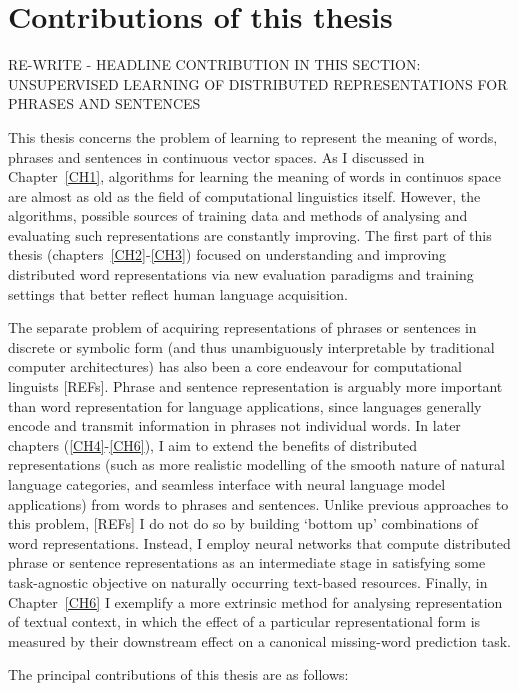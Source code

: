 
\section{Contributions of this thesis}


RE-WRITE - HEADLINE CONTRIBUTION IN THIS SECTION: UNSUPERVISED LEARNING OF DISTRIBUTED REPRESENTATIONS FOR PHRASES AND SENTENCES

This thesis concerns the problem of learning to represent the meaning of words, phrases and sentences in continuous vector spaces. As I discussed in Chapter~\ref{CH1}, algorithms for learning the meaning of words in continuos space are almost as old as the field of computational linguistics itself. However, the algorithms, possible sources of training data and methods of analysing and evaluating such representations are constantly improving. The first part of this thesis (chapters~\ref{CH2}-\ref{CH3}) focused on understanding and improving distributed word representations via new evaluation paradigms and training settings that better reflect human language acquisition.

The separate problem of acquiring representations of phrases or sentences in discrete or symbolic form (and thus unambiguously interpretable by traditional computer architectures) has also been a core endeavour for computational linguists [REFs]. Phrase and sentence representation is arguably more important than word representation for language applications, since languages generally encode and transmit information in phrases not individual words. In later chapters (\ref{CH4}-\ref{CH6}), I aim to extend the benefits of distributed representations (such as more realistic modelling of the smooth nature of natural language categories, and seamless interface with neural language model applications) from words to phrases and sentences. Unlike previous approaches to this problem, [REFs] I do not do so by building `bottom up' combinations of word representations. Instead, I employ neural networks that compute distributed phrase or sentence representations as an intermediate stage in satisfying some task-agnostic objective on naturally occurring text-based resources. Finally, in Chapter~\ref{CH6} I exemplify a more extrinsic method for analysing representation of textual context, in which the effect of a particular representational form is measured by their downstream effect on a canonical missing-word prediction task.   

The principal contributions of this thesis are as follows:

